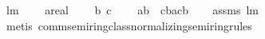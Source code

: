 \begin{isabellebody}
%
\isadelimproof
\isanewline
%
\endisadelimproof
\isanewline
{}\isamarkupfalse%
\ lm{}{}{}{\isacharcolon}\ \isanewline
\ \ \ a{\isacharcolon}{\isacharcolon}real\ \isanewline
\ \ \ b\ c\ \isanewline
\ \ \ {\isachardoublequoteopen}a{\isacharasterisk}b\ {\isacharminus}\ c{\isacharasterisk}b{\isacharequal}{\isacharparenleft}a{\isacharminus}c{\isacharparenright}{\isacharasterisk}b{\isachardoublequoteclose}\isanewline
%
\isadelimproof
\ \ %
\endisadelimproof
%
\isatagproof
{}\isamarkupfalse%
\ assms\ lm{}{}{}\ \isamarkupfalse%
\ {\isacharparenleft}metis\ comm{\isacharunderscore}semiring{\isacharunderscore}{}{\isacharunderscore}class{\isachardot}normalizing{\isacharunderscore}semiring{\isacharunderscore}rules{\isacharparenleft}{}{\isacharparenright}{\isacharparenright}%
\endisatagproof
{\isafoldproof}%
%
\isadelimproof
\isanewline
%
\endisadelimproof
%
\isadelimtheory
\isanewline
%
\endisadelimtheory
%
\isatagtheory
{}\isamarkupfalse%
%
\endisatagtheory
{\isafoldtheory}%
%
\isadelimtheory
%
\endisadelimtheory
\end{isabellebody}%
